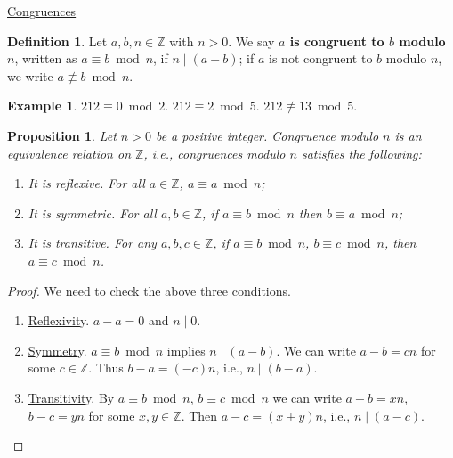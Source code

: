 \documentclass{amsbook}
\theoremstyle{plain}
\newtheorem{proposition}[theorem]{Proposition}
\theoremstyle{definition}
\newtheorem{definition}[theorem]{Definition}
\newtheorem{example}[theorem]{Example}
\theoremstyle{remark}
\numberwithin{equation}{chapter}
\numberwithin{figure}{chapter}
\newcommand{\Z}{\mathbb{Z}}
\begin{document}
\underline{Con}g\underline{ruences}
\begin{definition}
  Let $a, b, n \in \Z$ with $n > 0$. We say \textbf{$a$ is congruent to $b$ modulo $n$}, written as $a \equiv b \bmod n$, if $n \mid (a - b)$; if $a$ is not congruent to $b$ modulo $n$, we write $a \not \equiv b \bmod n$.
\end{definition}
\begin{example}
  $212 \equiv 0 \bmod 2$. $212 \equiv 2 \bmod 5$. $212 \not \equiv 13 \bmod 5$. 
\end{example}
\begin{proposition}
  Let $n > 0$ be a positive integer. Congruence modulo $n$ is an equivalence relation on $\Z$, i.e., congruences modulo $n$ satisfies the following:
  \begin{enumerate}[label=(\arabic*)]
  \item It is reflexive. For all $a \in \Z$, $a \equiv a \bmod n$;
  \item It is symmetric. For all $a, b \in \Z$, if $a \equiv b \bmod n$ then $b \equiv a \bmod n$;
  \item It is transitive. For any $a, b, c \in \Z$, if $a \equiv b \bmod n$, $b \equiv c \bmod n$, then $a \equiv c \bmod n$.
  \end{enumerate}
\end{proposition}
\begin{proof}
  We need to check the above three conditions.
  \begin{enumerate}[label=(\roman*)]
  \item \underline{Reflexivit}y. $a - a = 0$ and $n \mid 0$.  
  \item \underline{S}y\underline{mmetr}y. $a \equiv b \bmod n$ implies $n \mid (a - b)$. We can write $a - b = cn$ for some $c \in \Z$. Thus $b - a = (-c)n$, i.e., $n \mid (b - a)$.
  \item \underline{Transitivit}y. By $a \equiv b \bmod n$, $b \equiv c \bmod n$ we can write $a - b = xn$, $b - c = yn$ for some $x, y \in \Z$. Then $a - c = (x+y)n$, i.e., $n \mid (a - c)$.
  \end{enumerate}
\end{proof}
\end{document}
